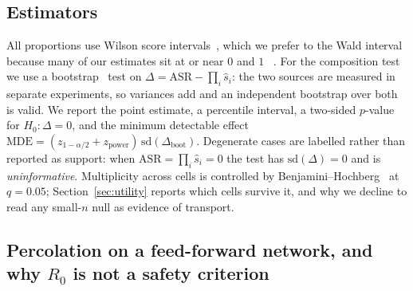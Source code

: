 \documentclass[sigconf,anonymous]{aamas}
\begin{document}
\subsection{Estimators}

All proportions use Wilson score intervals~\cite{Wilson1927}, which we prefer to
the Wald interval because many of our estimates sit at or near $0$ and $1$
~\cite{Brown2001}. For the composition test we use a bootstrap~\cite{Efron1979}
test on $\Delta = \mathrm{ASR} - \prod_i \hat s_i$: the two sources are measured in
separate experiments, so variances add and an independent bootstrap over both is
valid. We report the point estimate, a percentile interval, a two-sided $p$-value for
$H_0\!: \Delta = 0$, and the minimum detectable effect
$\mathrm{MDE} = (z_{1-\alpha/2} + z_{\mathrm{power}})\,\mathrm{sd}(\Delta_{\mathrm{boot}})$.
Degenerate cases are labelled rather than reported as support: when
$\mathrm{ASR} = \prod_i \hat s_i = 0$ the test has $\mathrm{sd}(\Delta) = 0$ and is
\emph{uninformative}. Multiplicity across cells
is controlled by Benjamini--Hochberg~\cite{BH1995} at $q = 0.05$;
Section~\ref{sec:utility} reports which cells survive it, and why we decline to
read any small-$n$ null as evidence of transport.

\subsection{Percolation on a feed-forward network, and why
\texorpdfstring{$R_0$}{R0} is not a safety criterion}
\label{sec:threshold}
\end{document}

